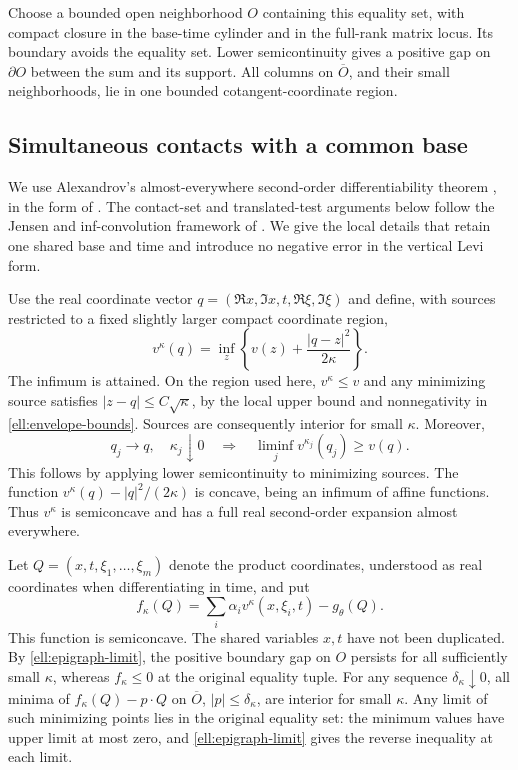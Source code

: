 Choose a bounded open neighborhood $O$ containing this equality set,
with compact closure in the base-time cylinder and in the full-rank
matrix locus.  Its boundary avoids the equality set.  Lower
semicontinuity gives a positive gap on $\partial O$ between the sum
and its support.  All columns on $\overline O$, and their small
neighborhoods, lie in one bounded cotangent-coordinate region.

\subsection{Simultaneous contacts with a common base}

We use Alexandrov's almost-everywhere second-order differentiability
theorem \cite{Aleksandrov1939}, in the form of
\cite[Appendix A, Theorem~A.2]{CIL}.  The contact-set and translated-test
arguments below follow the Jensen and inf-convolution framework
of \cite[Appendix A, Lemmas~A.3--A.5]{CIL}.  We give the local details
that retain one shared base and time and introduce no negative
error in the vertical Levi form.

Use the real coordinate vector $q=(\Re x,\Im x,t,\Re\xi,\Im\xi)$ and
define, with sources restricted to a fixed slightly larger compact
coordinate region,
\begin{equation}\label{ell:inf-convolution}
 v^\kappa(q)=\inf_z\left\{v(z)+\frac{|q-z|^2}{2\kappa}\right\}.
\end{equation}
The infimum is attained.  On the region used here,
$v^\kappa\le v$ and any minimizing source satisfies
$|z-q|\le C\sqrt\kappa$, by the local upper bound and nonnegativity
in \eqref{ell:envelope-bounds}.  Sources are consequently interior
for small $\kappa$.  Moreover,
\begin{equation}\label{ell:epigraph-limit}
 q_j\to q,\quad\kappa_j\downarrow0
 \quad\Longrightarrow\quad
 \liminf_j v^{\kappa_j}(q_j)\ge v(q).
\end{equation}
This follows by applying lower semicontinuity to minimizing sources.
The function $v^\kappa(q)-|q|^2/(2\kappa)$ is concave, being an
infimum of affine functions.  Thus $v^\kappa$ is semiconcave and has
a full real second-order expansion almost everywhere.

Let $Q=(x,t,\xi_1,\ldots,\xi_m)$ denote the product coordinates,
understood as real coordinates when differentiating in time, and put
\[
 f_\kappa(Q)=\sum_i\alpha_i v^\kappa(x,\xi_i,t)-g_\theta(Q).
\]
This function is semiconcave.  The shared variables $x,t$ have not
been duplicated.  By \eqref{ell:epigraph-limit}, the positive boundary
gap on $O$ persists for all sufficiently small $\kappa$, whereas
$f_\kappa\le0$ at the original equality tuple.  For any sequence
$\delta_\kappa\downarrow0$, all minima of
$f_\kappa(Q)-p\cdot Q$ on $\overline O$, $|p|\le\delta_\kappa$,
are interior for small $\kappa$.  Any limit of such minimizing points
lies in the original equality set: the minimum values have upper
limit at most zero, and \eqref{ell:epigraph-limit} gives the reverse
inequality at each limit.

